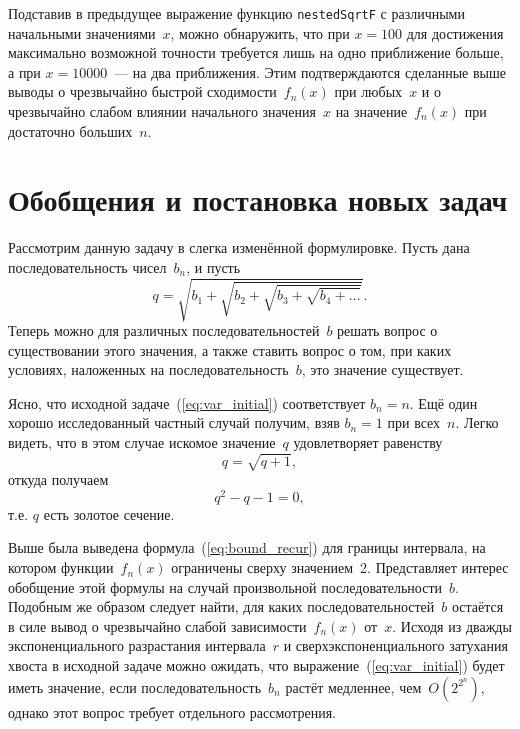 \documentclass[12pt]{article}
\begin{document}
Подставив в предыдущее выражение функцию \lstinline{nestedSqrtF} с различными начальными значениями~\(x\), можно обнаружить, что при \(x=100\) для достижения максимально
возможной точности требуется лишь на одно приближение больше, а при \(x=10000\)~--- на два приближения. Этим подтверждаются сделанные выше выводы о чрезвычайно
быстрой сходимости~\(f_n(x)\) при любых~\(x\) и о чрезвычайно слабом влиянии начального значения~\(x\) на значение~\(f_n(x)\) при достаточно больших~\(n\).

\section{Обобщения и постановка новых задач}\label{sec:variations}

Рассмотрим данную задачу в слегка изменённой формулировке. Пусть дана последовательность чисел~\(b_n\), и пусть
\begin{equation} \label{eq:var_initial}
q = \sqrt{b_1 + \sqrt{b_2 + \sqrt{b_3 + \sqrt{b_4 +\ldots}}}} .
\end{equation}
Теперь можно для различных последовательностей~\(b\) решать вопрос о существовании этого значения, а также ставить вопрос о том, при каких условиях, наложенных
на последовательность~\(b\), это значение существует.

Ясно, что исходной задаче~(\ref{eq:var_initial}) соответствует \(b_n = n\).
Ещё один хорошо исследованный частный случай получим, взяв \(b_n = 1\) при всех~\(n\). Легко видеть, что в этом случае искомое значение~\(q\) удовлетворяет
равенству
\[
    q = \sqrt{q + 1} ,
\]
откуда получаем
\[
    q^2 - q - 1 = 0 ,
\]
т.е. \(q\) есть золотое сечение.

Выше была выведена формула~(\ref{eq:bound_recur}) для границы интервала, на котором функции~\(f_n(x)\) ограничены сверху значением~2. Представляет интерес
обобщение этой формулы на случай произвольной последовательности~\(b\).
Подобным же образом следует найти, для каких последовательностей~\(b\) остаётся в силе вывод о чрезвычайно слабой зависимости~\(f_n(x)\) от~\(x\).
Исходя из дважды экспоненциального разрастания интервала~\(r\) и сверхэкспоненциального затухания хвоста в исходной задаче можно ожидать, что
выражение~(\ref{eq:var_initial}) будет иметь значение, если последовательность~\(b_n\) растёт медленнее, чем~\(O(2^{2^n})\), однако этот вопрос требует
отдельного рассмотрения.
\end{document}
